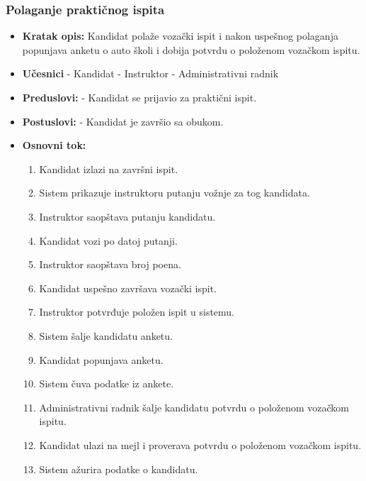 \subsubsection{Polaganje praktičnog ispita}

\vspace{3mm}

\begin{itemize}

\item \textbf{Kratak opis:} Kandidat polaže vozački ispit i nakon uspešnog polaganja popunjava anketu o auto školi i dobija potvrdu o položenom vozačkom ispitu.

\vspace{2mm}

\item \textbf{Učesnici} \newline
   - Kandidat \newline   
   - Instruktor \newline
   - Administrativni radnik 
   
\item \textbf{Preduslovi:} \newline
   - Kandidat se prijavio za praktični ispit.

\item \textbf{Postuslovi:} \newline
    - Kandidat je završio sa obukom.

\item \textbf{Osnovni tok:}  
   \begin{enumerate}
   \item Kandidat izlazi na završni ispit.
   \item Sistem prikazuje instruktoru putanju vožnje za tog kandidata.
   \item Instruktor saopštava putanju kandidatu.
   \item Kandidat vozi po datoj putanji.
   \item Instruktor saopštava broj poena.
   \item Kandidat uspešno završava vozački ispit.
   \item Instruktor potvrđuje položen ispit u sistemu.
   \item Sistem šalje kandidatu anketu.
   \item Kandidat popunjava anketu.
   \item Sistem čuva podatke iz ankete.
   \item Administrativni radnik šalje kandidatu potvrdu o položenom vozačkom ispitu.
   \item Kandidat ulazi na mejl i proverava potvrdu o položenom vozačkom ispitu.
   \item Sistem ažurira podatke o kandidatu.     


\end{enumerate}
\end{itemize}
